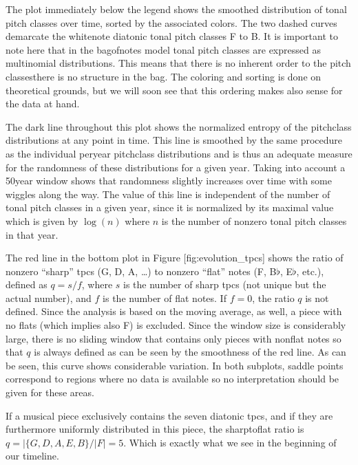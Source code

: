 \documentclass[letterpaper,10pt,english]{sphinxmanual}
\begin{document}
\sphinxAtStartPar
The plot immediately below the legend shows the smoothed distribution of
tonal pitch classes over time, sorted by the associated colors. The two
dashed curves demarcate the white\sphinxhyphen{}note diatonic tonal pitch classes F to
B. It is important to note here that in the bag\sphinxhyphen{}of\sphinxhyphen{}notes model tonal
pitch classes are expressed as multinomial distributions. This means
that there is no inherent order to the pitch classes\textendash{}there is no
structure in the bag. The coloring and sorting is done on theoretical
grounds, but we will soon see that this ordering makes also sense for
the data at hand.

\sphinxAtStartPar
The dark line throughout this plot shows the normalized entropy of the
pitch\sphinxhyphen{}class distributions at any point in time. This line is smoothed by
the same procedure as the individual per\sphinxhyphen{}year pitch\sphinxhyphen{}class distributions
and is thus an adequate measure for the randomness of these
distributions for a given year. Taking into account a 50\sphinxhyphen{}year window
shows that randomness slightly increases over time with some wiggles
along the way. The value of this line is independent of the number of
tonal pitch classes in a given year, since it is normalized by its
maximal value which is given by \(\log(n)\) where \(n\) is the
number of non\sphinxhyphen{}zero tonal pitch classes in that year.

\sphinxAtStartPar
The red line in the bottom plot in Figure {[}fig:evolution\_tpcs{]} shows
the ratio of non\sphinxhyphen{}zero “sharp” tpcs (G, D, A, …) to non\sphinxhyphen{}zero “flat”
notes (F, B\(\flat\), E\(\flat\), etc.), defined as
\(q=s/f\), where \(s\) is the number of sharp tpcs (not unique
but the actual number), and \(f\) is the number of flat notes. If
\(f=0\), the ratio \(q\) is not defined. Since the analysis is
based on the moving average, as well, a piece with no flats (which
implies also F) is excluded. Since the window size is considerably
large, there is no sliding window that contains only pieces with
non\sphinxhyphen{}flat notes so that \(q\) is always defined as can be seen by the
smoothness of the red line. As can be seen, this curve shows
considerable variation. In both subplots, saddle points correspond to
regions where no data is available so no interpretation should be given
for these areas.

\sphinxAtStartPar
{}

\sphinxAtStartPar
If a musical piece exclusively contains the seven diatonic tpcs, and if
they are furthermore uniformly distributed in this piece, the
sharp\sphinxhyphen{}to\sphinxhyphen{}flat ratio is \(q=|\{G, D, A, E, B\}/|F|=5\). Which is
exactly what we see in the beginning of our timeline.
\end{document}
